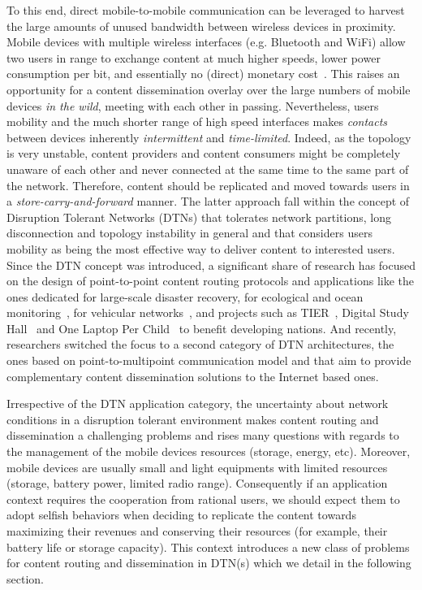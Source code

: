 To this end, direct mobile-to-mobile communication can be leveraged to harvest the large amounts of unused bandwidth between wireless devices in proximity. Mobile devices with multiple wireless interfaces (e.g. Bluetooth and WiFi) allow two users in range to exchange content at much higher speeds, lower power consumption per bit, and essentially no (direct) monetary cost~\cite{Energy-Delay}. This raises an opportunity for a content dissemination overlay over the large numbers of mobile devices \emph{in the wild}, meeting with each other in passing. Nevertheless, users mobility and the much shorter range of high speed interfaces makes \emph{contacts} between devices inherently \emph{intermittent} and \emph{time-limited}. Indeed, as the topology is very unstable, content providers and content consumers might be completely unaware of each other and never connected at the same time to the same part of the network. Therefore, content should be replicated and moved towards users in a \emph{store-carry-and-forward} manner. The latter approach fall within the concept of Disruption Tolerant Networks (DTNs) that tolerates network partitions, long disconnection and topology instability in general and that considers users mobility as being the most effective way to deliver content to interested users. Since the DTN concept was introduced,  a significant share of research has focused on the design of point-to-point content routing protocols and applications like the ones dedicated for large-scale disaster recovery, for ecological and ocean monitoring~\cite{Juang:zebranet, Heidemann:Acoustic}, for vehicular networks~\cite{Levine:MaxProp}, and projects such as TIER~\cite{TIER}, Digital Study Hall~\cite{DSH} and One Laptop Per Child~\cite{OneLaptopPerChild} to benefit developing nations. And recently, researchers switched the focus to a second category of DTN architectures, the ones based on point-to-multipoint communication model and that aim to provide complementary content dissemination solutions to the Internet based ones. 

Irrespective of the DTN application category, the uncertainty about network conditions in a disruption tolerant environment makes content routing and dissemination a challenging problems and rises many questions with regards to the management of the mobile devices resources (storage, energy, etc). Moreover, mobile devices are usually small and light equipments with limited resources (storage, battery power, limited radio range). Consequently if an application context requires the cooperation from rational users, we should expect them to adopt selfish behaviors when deciding to replicate the content towards maximizing their revenues and conserving their resources (for example, their battery life or storage capacity). This context introduces a new class of problems for content routing and dissemination in DTN(s) which we detail in the following section.

